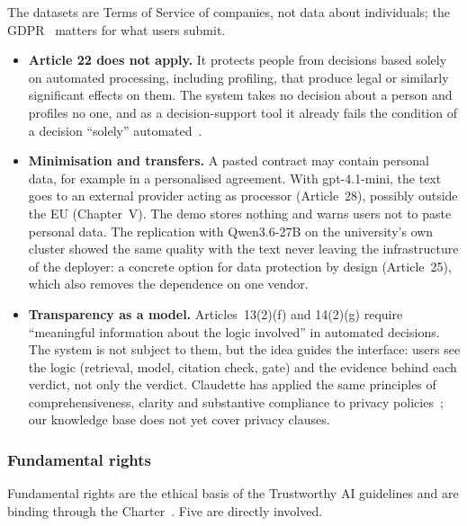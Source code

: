 The datasets are Terms of Service of companies, not data about individuals; the GDPR~\citep{gdpr2016} matters for what users submit.

\begin{itemize}
  \item \textbf{Article 22 does not apply.} It protects people from decisions based solely on automated processing, including profiling, that produce legal or similarly significant effects on them. The system takes no decision about a person and profiles no one, and as a decision-support tool it already fails the condition of a decision ``solely'' automated~\citep{slides_gdpr}.
  \item \textbf{Minimisation and transfers.} A pasted contract may contain personal data, for example in a personalised agreement. With gpt-4.1-mini, the text goes to an external provider acting as processor (Article~28), possibly outside the EU (Chapter~V). The demo stores nothing and warns users not to paste personal data. The replication with Qwen3.6-27B on the university's own cluster showed the same quality with the text never leaving the infrastructure of the deployer: a concrete option for data protection by design (Article~25), which also removes the dependence on one vendor.
  \item \textbf{Transparency as a model.} Articles~13(2)(f) and 14(2)(g) require ``meaningful information about the logic involved'' in automated decisions. The system is not subject to them, but the idea guides the interface: users see the logic (retrieval, model, citation check, gate) and the evidence behind each verdict, not only the verdict. Claudette has applied the same principles of comprehensiveness, clarity and substantive compliance to privacy policies~\citep{slides_claudette}; our knowledge base does not yet cover privacy clauses.
\end{itemize}

\subsubsection{Fundamental rights}
\label{sec:ethics-rights}

Fundamental rights are the ethical basis of the Trustworthy AI guidelines and are binding through the Charter~\citep{charter2012}. Five are directly involved.

